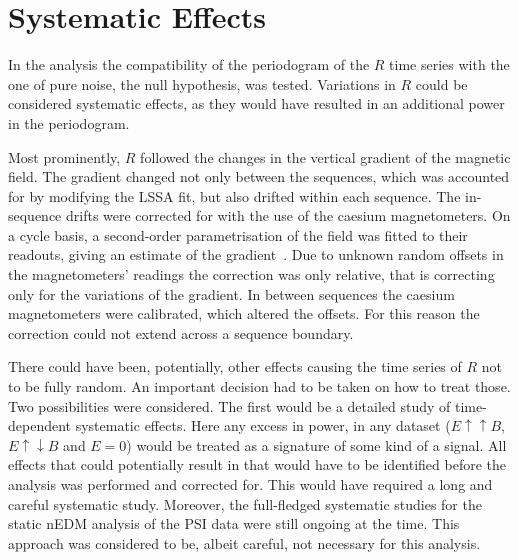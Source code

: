 



\section{Systematic Effects}
In the analysis the compatibility of the periodogram of the $R$ time series with the one of pure noise, the null hypothesis, was tested. Variations in $R$ could be considered systematic effects, as they would have resulted in an additional power in the periodogram.

Most prominently, $R$ followed the changes in the vertical gradient of the magnetic field. The gradient changed not only between the sequences, which was accounted for by modifying the LSSA fit, but also drifted within each sequence.
The in-sequence drifts were corrected for with the use of the caesium magnetometers. On a cycle basis, a second-order parametrisation of the field was fitted to their readouts, giving an estimate of the gradient~\cite{Afach2014magmoment,WurstenThesis}. Due to unknown random offsets in the magnetometers' readings the correction was only relative, that is correcting only for the variations of the gradient. In between sequences the caesium magnetometers were calibrated, which altered the offsets. For this reason the correction could not extend across a sequence boundary.

There could have been, potentially, other effects causing the time series of $R$ not to be fully random. An important decision had to be taken on how to treat those. Two possibilities were considered. The first would be a detailed study of time-dependent systematic effects.
Here any excess in power, in any dataset ($E \uparrow \uparrow B$, $E \uparrow \downarrow B$ and $E=0$) would be treated as a signature of some kind of a signal. All effects that could potentially result in that would have to be identified before the analysis was performed and corrected for. This would have required a long and careful systematic study. Moreover, the full-fledged systematic studies for the static nEDM analysis of the PSI data were still ongoing at the time. This approach was considered to be, albeit careful, not necessary for this analysis.


